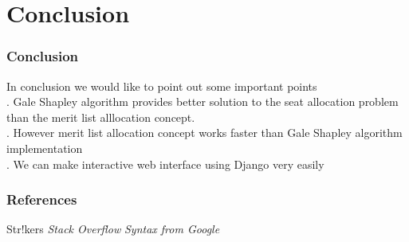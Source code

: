 \documentclass[]{beamer}%
\begin{document}
\section{Conclusion}
\begin{frame}
\frametitle{Conclusion}
In conclusion we would like to point out some important points \\ . Gale Shapley algorithm provides better solution to the seat allocation problem than the merit list alllocation concept. \\ . However merit list allocation concept works faster than Gale Shapley algorithm implementation \\ . We can make interactive web interface using Django very easily \\ \pause 
\end{frame}

\begin{frame}
\frametitle{References}
\footnotesize{
\begin{thebibliography}{99}
 Str!kers
\newblock \emph{Stack Overflow}
\newblock \emph{Syntax from Google}


\end{thebibliography}
}
\end{frame}
\end{document}
